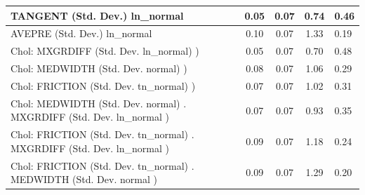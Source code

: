 \begin{table}
\begin{center}
\begin{tabular}{|l|l|c|c|c|l|}
			\hline
			TANGENT (Std. Dev.) ln_normal &  & 0.05 & 0.07 & 0.74 & 0.46 \\
			\hline
			AVEPRE (Std. Dev.) ln_normal &  & 0.10 & 0.07 & 1.33 & 0.19 \\
			\hline
			 Chol: MXGRDIFF (Std. Dev. ln_normal) ) &  & 0.05 & 0.07 & 0.70 & 0.48 \\
			\hline
			 Chol: MEDWIDTH (Std. Dev. normal) ) &  & 0.08 & 0.07 & 1.06 & 0.29 \\
			\hline
			 Chol: FRICTION (Std. Dev. tn_normal) ) &  & 0.07 & 0.07 & 1.02 & 0.31 \\
			\hline
			 Chol: MEDWIDTH (Std. Dev. normal) . MXGRDIFF (Std. Dev.   ln_normal ) &  & 0.07 & 0.07 & 0.93 & 0.35 \\
			\hline
			 Chol: FRICTION (Std. Dev. tn_normal) . MXGRDIFF (Std. Dev.   ln_normal ) &  & 0.09 & 0.07 & 1.18 & 0.24 \\
			\hline
			 Chol: FRICTION (Std. Dev. tn_normal) . MEDWIDTH (Std. Dev.   normal ) &  & 0.09 & 0.07 & 1.29 & 0.20 \\
			\hline
		\end{tabular}
	\end{center}
\end{table}